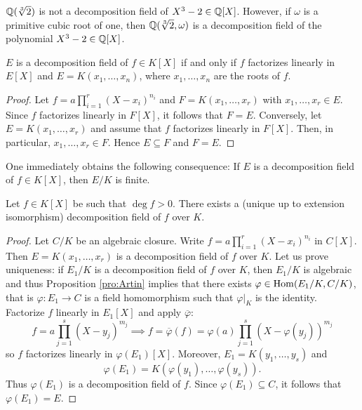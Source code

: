 \begin{example}
	$\mathbb{Q}(\sqrt[3]{2})$ is not a decomposition field of $X^3-2\in\mathbb{Q}[X]$. However, if
	$\omega$ is a primitive cubic root of one, then 
	$\mathbb{Q}(\sqrt[3]{2},\omega)$ is a decomposition field of the polynomial $X^3-2\in\mathbb{Q}[X]$. 
\end{example}

\begin{proposition}
	$E$ is a decomposition field of $f\in K[X]$ if and only if
	$f$ factorizes linearly in $E[X]$ and $E=K(x_1,\dots,x_n)$, where 
	$x_1,\dots,x_n$ are the roots of $f$. 
\end{proposition}

\begin{proof}
    Let $f=a\prod_{i=1}^r(X-x_i)^{n_i}$ and $F=K(x_1,\dots,x_r)$ with $x_1,\dots,x_r\in E$. Since $f$
    factorizes linearly in $F[X]$, it follows that $F=E$. 
    Conversely, let $E=K(x_1,\dots,x_r)$ and assume that $f$ factorizes linearly
    in $F[X]$. Then, in particular, $x_1,\dots,x_r\in F$. Hence $E\subseteq F$ and
    $F=E$. 
\end{proof}

One immediately obtains the following consequence:
If $E$ is a decomposition field of $f\in K[X]$, then $E/K$ is finite. 

\begin{theorem}
    Let $f\in K[X]$ be such that $\deg f>0$. There exists a (unique up to extension isomorphism) 
    decomposition field of $f$ over $K$. 
\end{theorem}

\begin{proof}
    Let $C/K$ be an algebraic closure. Write $f=a\prod_{i=1}^r(X-x_i)^{n_i}$ in $C[X]$. 
    Then $E=K(x_1,\dots,x_r)$ is a decomposition field of $f$ over $K$. Let us prove
    uniqueness: if $E_1/K$ is a decomposition field of $f$ over $K$, 
    then $E_1/K$ is algebraic and thus Proposition
    \ref{pro:Artin} implies that 
    there exists $\varphi\in\operatorname{Hom}(E_1/K,C/K)$, that is $\varphi\colon E_1\to C$ is a field
    homomorphism such that $\varphi|_K$ is the identity.
    Factorize $f$ linearly in $E_1[X]$ and apply $\overline{\varphi}$:
    \[
    f=a\prod_{j=1}^s(X-y_j)^{m_j}
    \implies
    f=\overline{\varphi}(f)=\varphi(a)\prod_{j=1}^s(X-\varphi(y_j))^{m_j}
    \]
    so $f$ factorizes linearly in $\varphi(E_1)[X]$. Moreover, 
    $E_1=K(y_1,\dots,y_s)$ and  
    \[
    \varphi(E_1)=K(\varphi(y_1),\dots,\varphi(y_s)).
    \]
    Thus
    $\varphi(E_1)$ is a decomposition field of $f$. Since  
    $\varphi(E_1)\subseteq C$, it follows that $\varphi(E_1)=E$. 
\end{proof}

